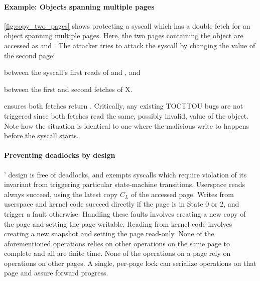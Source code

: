 \paragraph{Example: Objects spanning multiple pages}
\autoref{fig:copy_two_pages} shows \midas protecting a syscall which
has a double fetch for an object spanning multiple pages.
Here, the two pages containing the object  are accessed as
 and .
The attacker tries to attack the syscall by changing the value of the
second page:
\begin{inparaenum}
\item between the syscall's first reads of  and , and
\item between the first and second fetches of X.
\end{inparaenum}
\midas ensures both fetches return .
Critically, any existing TOCTTOU bugs are not triggered since both fetches
read the same, possibly invalid, value of the object.
Note how the situation is identical to one where the malicious write
to  happens before the syscall starts.

\paragraph{Preventing deadlocks by design}
\midas' design is free of deadlocks, and exempts syscalls which
require violation of its invariant from triggering particular
state-machine transitions.
Userspace reads always succeed, using the latest copy $C_L$ of the
accessed page.
Writes from userspace and kernel code succeed directly if the
page is in State 0 or 2, and trigger a fault otherwise.
Handling these faults involves creating a new copy of the page and
setting the page writable.
Reading from kernel code involves creating a new snapshot and
setting the page read-only.
None of the aforementioned operations relies on other operations
on the same page to complete and all are finite time.
None of the operations on a page rely on operations on other pages.
A single, per-page lock can serialize operations on that page
and assure forward progress.

